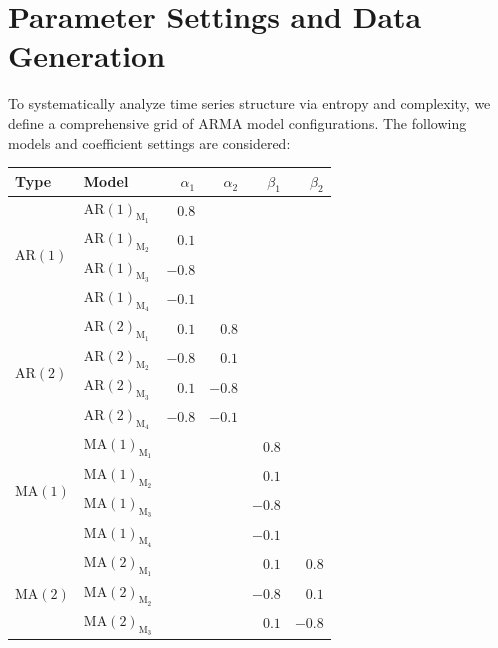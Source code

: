 \documentclass[12pt,a4paper]{article}
\begin{document}
\section{Parameter Settings and Data Generation}

To systematically analyze time series structure via entropy and complexity, we define a comprehensive grid of ARMA model configurations. The following models and coefficient settings are considered:

\begin{table}[H]
	\centering
	\begin{tabular}{llrrrr}
		\toprule
		\textbf{Type} & \textbf{Model} & $\alpha_1$ & $\alpha_2$ & $\beta_1$ & $\beta_2$ \\
		\midrule
		\multirow{4}[2]{*}{$\mathrm{AR}(1)$}      & $\mathrm{AR}(1)_{\textrm{M}_1}$  & $0.8$   &      &      &      \\
		& $\mathrm{AR}(1)_{\textrm{M}_2}$   & $0.1$   &      &      &      \\
		& $\mathrm{AR}(1)_{\textrm{M}_3}$   & $-0.8$  &      &      &      \\
		& $\mathrm{AR}(1)_{\textrm{M}_4}$   & $-0.1$  &      &      &      \\
		\midrule
		\multirow{4}[2]{*}{$\mathrm{AR}(2)$}      & $\mathrm{AR}(2)_{\textrm{M}_1}$   & $0.1$   & $0.8$  &      &      \\
		& $\mathrm{AR}(2)_{\textrm{M}_2}$  & $-0.8$  & $0.1$  &      &      \\
		& $\mathrm{AR}(2)_{\textrm{M}_3}$  & $0.1$   & $-0.8$ &      &      \\
		& $\mathrm{AR}(2)_{\textrm{M}_4}$  & $-0.8$  & $-0.1$ &      &      \\
		\midrule
		\multirow{4}[2]{*}{	$\mathrm{MA}(1)$}      & $\mathrm{MA}(1)_{\textrm{M}_1}$ &       &      & $0.8$  &      \\
		& $\mathrm{MA}(1)_{\textrm{M}_2}$  &       &      & $0.1$  &      \\
		& $\mathrm{MA}(1)_{\textrm{M}_3}$  &       &      & $-0.8$ &      \\
		& $\mathrm{MA}(1)_{\textrm{M}_4}$  &       &      & $-0.1$ &      \\
		\midrule
		\multirow{4}[2]{*}{$\mathrm{MA}(2)$}      & $\mathrm{MA}(2)_{\textrm{M}_1}$  &       &      & $0.1$  & $0.8$  \\
		& $\mathrm{MA}(2)_{\textrm{M}_2}$  &       &      & $-0.8$ & $0.1$  \\
		& $\mathrm{MA}(2)_{\textrm{M}_3}$  &       &      & $0.1$  & $-0.8$ \\

\end{tabular}
\end{table}
\end{document}
